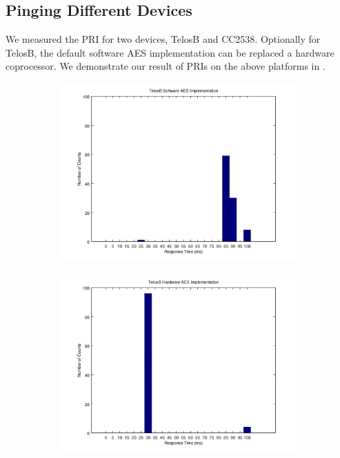 
\subsection{Pinging Different Devices}
We measured the PRI for two devices, TelosB\cite{TelosB} and CC2538\cite{CC2538}. Optionally for TelosB, the default software AES implementation can be replaced a hardware coprocessor. We demonstrate our result of PRIs on the above platforms in .

\begin{figure}[ht!]
	\centering
	\begin{subfigure}{0.4\textwidth}
	{
		\includegraphics[width=\textwidth]{fig/noncoresec_ping_telosb_sw.png}
	}
	\end{subfigure}
	\begin{subfigure}{0.4\textwidth}
	{
		\includegraphics[width=\textwidth]{fig/noncoresec_ping_telosb_hw.png}
}
\end{subfigure}
\end{figure}
